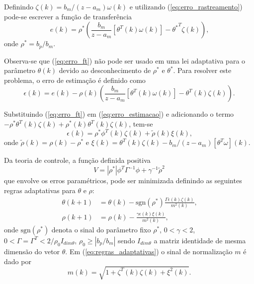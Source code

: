     Definindo $\zeta (k) = b_m / (z - a_m) \omega (k)$ e utilizando (\ref{eq:erro_rastreamento})
    pode-se escrever a função de transferência
    \begin{equation}
        e(k) = \rho^* \left( \frac{b_m}{z - a_m} \left[ \theta^T (k) \omega (k) \right]
            - {\theta^*}^T \zeta (k) \right) \text{,}
        \label{eq:erro_ft}
    \end{equation}
    onde $\rho^* = b_p / b_m$.

    Observa-se que (\ref{eq:erro_ft}) não pode ser usado em uma lei adaptativa para
    o parâmetro $\theta (k)$ devido ao desconhecimento de $\rho^*$ e $\theta^*$. Para
    resolver este problema, o erro de estimação é definido como
    \begin{equation}
        \epsilon (k) = e (k) - \rho(k) \left( \frac{b_m}{z - a_m} \left[ \theta^T (k) \omega(k)
            \right] - \theta^T (k) \zeta(k) \right) \text{.}
        \label{eq:erro_estimacao}
    \end{equation}

    Substituindo (\ref{eq:erro_ft}) em (\ref{eq:erro_estimacao}) e adicionando o termo
    $-\rho^* \theta^T (k) \zeta (k) + \rho^* (k) \theta^T (k) \zeta(k)$, tem-se
    \begin{equation}
        \epsilon(k) = \rho^* \phi^T(k) \zeta(k) + \tilde{\rho}(k) \xi(k) \text{,}
        \label{eq:epsilon_k}
    \end{equation}
    onde $\tilde{\rho}(k) = \rho(k) - \rho^*$ e $\xi(k) = \theta^T(k) \zeta(k) -
    b_m / (z - a_m)[\theta^T \omega](k)$.

    Da teoria de controle, a função definida positiva
    \begin{equation}
        V = |\rho^*| \phi^T \Gamma^{-1} \phi + \gamma^{-1} {\tilde{\rho}}^2
        \label{eq:funcao_positiva}
    \end{equation}
    que envolve os erros paramétricos, pode ser minimizada definindo as seguintes
    regras adaptativas para $\theta$ e $\rho$:
    \begin{subequations}
        \begin{align}
            \theta(k + 1) & = \theta(k) - \text{sgn}(\rho^*)\frac{\Gamma \epsilon(k)\zeta(k)}
                {m^2(k)} \text{,}\\
            \rho(k + 1) & = \rho(k) - \frac{\gamma \epsilon(k) \xi(k)}{m^2(k)} \text{,}
        \end{align}
        \label{eq:regras_adaptativas}
    \end{subequations}
    onde $\text{sgn}(\rho^*)$ denota o sinal do parâmetro fixo $\rho^*$,
    $0 < \gamma < 2$, $0 < \Gamma = \Gamma^T < 2/\rho_0 I_{dim \theta}$,
    $\rho_0 \geq |b_p / b_m|$ sendo $I_{dim \theta}$ a matriz identidade de mesma
    dimensão do vetor $\theta$. Em (\ref{eq:regras_adaptativas}) o sinal de
    normalização $m$ é dado por
    \begin{equation}
        m(k) = \sqrt{1 + \zeta^T(k) \zeta(k) + \xi^2(k)} \text{.}
    \end{equation}

